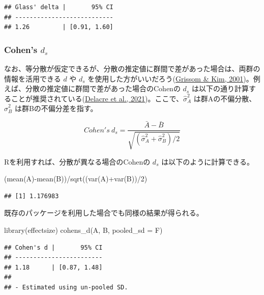 \documentclass[
  ja=standard, xelatex, base=12pt]{bxjsreport}
\newenvironment{Shaded}{\begin{snugshade}}{\end{snugshade}}
\newcommand{\AttributeTok}[1]{\textcolor[rgb]{0.77,0.63,0.00}{#1}}
\newcommand{\DecValTok}[1]{\textcolor[rgb]{0.00,0.00,0.81}{#1}}
\newcommand{\FunctionTok}[1]{\textcolor[rgb]{0.00,0.00,0.00}{#1}}
\newcommand{\NormalTok}[1]{#1}
\newcommand{\SpecialCharTok}[1]{\textcolor[rgb]{0.00,0.00,0.00}{#1}}
\begin{document}
\begin{verbatim}
## Glass' delta |       95% CI
## ---------------------------
## 1.26         | [0.91, 1.60]
\end{verbatim}

\hypertarget{cohens-d_s-1}{%
\subsubsection{\texorpdfstring{Cohen's \(d_s\)}{Cohen's d\_s}}\label{cohens-d_s-1}}

なお、等分散が仮定できるが、分散の推定値に群間で差があった場合は、両群の情報を活用できる \(d\) や \(d_s\) を使用した方がいいだろう(\protect\hyperlink{ref-grissom2001}{Grissom \& Kim, 2001})。例えば、分散の推定値に群間で差があった場合のCohenの \(d_s\) は以下の通り計算することが推奨されている(\protect\hyperlink{ref-delacre2021}{Delacre et al., 2021})。ここで、\(\hat\sigma_A^2\) は群Aの不偏分散、\(\hat\sigma_B^2\) は群Bの不偏分差を指す。

\[
Cohen's~d_s=\frac{\bar{A}-\bar{B}}{\sqrt{(\hat\sigma_A^2+\hat\sigma_B^2)/2}}
\]

Rを利用すれば、分散が異なる場合のCohenの \(d_s\) は以下のように計算できる。

\begin{Shaded}
\begin{Highlighting}[]
\NormalTok{(}\FunctionTok{mean}\NormalTok{(A)}\SpecialCharTok{{-}}\FunctionTok{mean}\NormalTok{(B))}\SpecialCharTok{/}\FunctionTok{sqrt}\NormalTok{((}\FunctionTok{var}\NormalTok{(A)}\SpecialCharTok{+}\FunctionTok{var}\NormalTok{(B))}\SpecialCharTok{/}\DecValTok{2}\NormalTok{)}
\end{Highlighting}
\end{Shaded}

\begin{verbatim}
## [1] 1.176983
\end{verbatim}

既存のパッケージを利用した場合でも同様の結果が得られる。

\begin{Shaded}
\begin{Highlighting}[]
\FunctionTok{library}\NormalTok{(effectsize)}
\FunctionTok{cohens\_d}\NormalTok{(A, B, }\AttributeTok{pooled\_sd =}\NormalTok{ F)}
\end{Highlighting}
\end{Shaded}

\begin{verbatim}
## Cohen's d |       95% CI
## ------------------------
## 1.18      | [0.87, 1.48]
## 
## - Estimated using un-pooled SD.
\end{verbatim}
\end{document}
